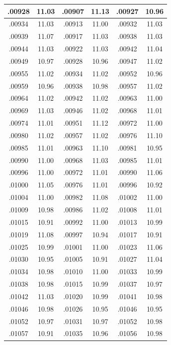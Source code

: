 \documentclass[10pt,twoside]{report}
\begin{document}
\begin{appendices}
\begin{longtable}{|c|c||c|c||c|c|}
.00928 & 11.03 & .00907 & 11.13 & .00927 & 10.96\\\hline
.00934 & 11.03 & .00913 & 11.00 & .00932 & 11.03\\\hline
.00939 & 11.07 & .00917 & 11.03 & .00938 & 11.03\\\hline
.00944 & 11.03 & .00922 & 11.03 & .00942 & 11.04\\\hline
.00949 & 10.97 & .00928 & 10.96 & .00947 & 11.02\\\hline
.00955 & 11.02 & .00934 & 11.02 & .00952 & 10.96\\\hline
.00959 & 10.96 & .00938 & 10.98 & .00957 & 11.02\\\hline
.00964 & 11.02 & .00942 & 11.02 & .00963 & 11.00\\\hline
.00969 & 11.03 & .00946 & 11.02 & .00968 & 11.01\\\hline
.00974 & 11.01 & .00951 & 11.12 & .00972 & 11.00\\\hline
.00980 & 11.02 & .00957 & 11.02 & .00976 & 11.10\\\hline
.00985 & 11.01 & .00963 & 11.10 & .00981 & 10.95\\\hline
.00990 & 11.00 & .00968 & 11.03 & .00985 & 11.01\\\hline
.00996 & 11.00 & .00972 & 11.01 & .00990 & 11.06\\\hline
.01000 & 11.05 & .00976 & 11.01 & .00996 & 10.92\\\hline
.01004 & 11.00 & .00982 & 11.08 & .01002 & 11.00\\\hline
.01009 & 10.98 & .00986 & 11.02 & .01008 & 11.01\\\hline
.01015 & 10.91 & .00992 & 11.00 & .01013 & 10.99\\\hline
.01019 & 11.08 & .00997 & 10.94 & .01017 & 10.91\\\hline
.01025 & 10.99 & .01001 & 11.00 & .01023 & 11.06\\\hline
.01030 & 10.95 & .01005 & 10.91 & .01027 & 11.04\\\hline
.01034 & 10.98 & .01010 & 11.00 & .01033 & 10.99\\\hline
.01038 & 10.98 & .01015 & 10.99 & .01037 & 10.97\\\hline
.01042 & 11.03 & .01020 & 10.99 & .01041 & 10.98\\\hline
.01046 & 10.98 & .01026 & 10.95 & .01046 & 10.95\\\hline
.01052 & 10.97 & .01031 & 10.97 & .01052 & 10.98\\\hline
.01057 & 10.91 & .01035 & 10.96 & .01056 & 10.98\\\hline

\end{longtable}
\end{appendices}
\end{document}
